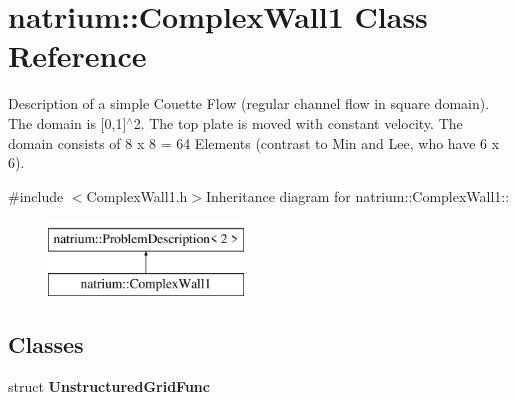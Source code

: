 \hypertarget{classnatrium_1_1ComplexWall1}{
\section{natrium::ComplexWall1 Class Reference}
\label{classnatrium_1_1ComplexWall1}
}


Description of a simple Couette Flow (regular channel flow in square domain). The domain is \mbox{[}0,1\mbox{]}$^\wedge$2. The top plate is moved with constant velocity. The domain consists of 8 x 8 = 64 Elements (contrast to Min and Lee, who have 6 x 6).  


{\ttfamily \#include $<$ComplexWall1.h$>$}Inheritance diagram for natrium::ComplexWall1::\begin{figure}[H]
\begin{center}
\leavevmode
\includegraphics[height=2cm]{classnatrium_1_1ComplexWall1}
\end{center}
\end{figure}
\subsection*{Classes}
\begin{DoxyCompactItemize}
\item 
struct {\bfseries UnstructuredGridFunc}
\end{DoxyCompactItemize}

